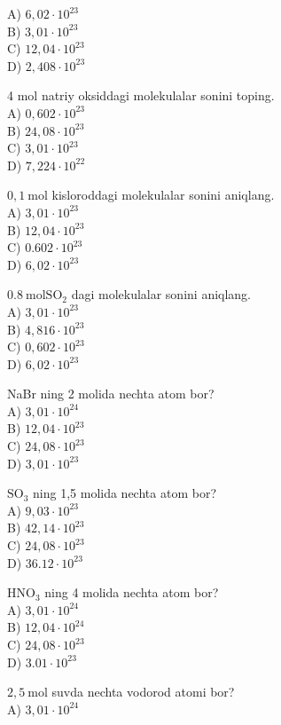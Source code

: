 A) $6,02 \cdot 10^{23}$\\
B) $3,01 \cdot 10^{23}$\\
C) $12,04 \cdot 10^{23}$\\
D) $2,408 \cdot 10^{23}$
  \item 4 mol natriy oksiddagi molekulalar sonini toping.\\
A) $0,602 \cdot 10^{23}$\\
B) $24,08 \cdot 10^{23}$\\
C) $3,01 \cdot 10^{23}$\\
D) $7,224 \cdot 10^{22}$
  \item $0,1 \mathrm{~mol}$ kisloroddagi molekulalar sonini aniqlang.\\
A) $3,01 \cdot 10^{23}$\\
B) $12,04 \cdot 10^{23}$\\
C) $0.602 \cdot 10^{23}$\\
D) $6,02 \cdot 10^{23}$
  \item $0.8 \mathrm{~mol} \mathrm{SO}_{2}$ dagi molekulalar sonini aniqlang.\\
A) $3,01 \cdot 10^{23}$\\
B) $4,816 \cdot 10^{23}$\\
C) $0,602 \cdot 10^{23}$\\
D) $6,02 \cdot 10^{23}$
  \item NaBr ning 2 molida nechta atom bor?\\
A) $3,01 \cdot 10^{24}$\\
B) $12,04 \cdot 10^{23}$\\
C) $24,08 \cdot 10^{23}$\\
D) $3,01 \cdot 10^{23}$
  \item $\mathrm{SO}_{3}$ ning 1,5 molida nechta atom bor?\\
A) $9,03 \cdot 10^{23}$\\
B) $42,14 \cdot 10^{23}$\\
C) $24,08 \cdot 10^{23}$\\
D) $36.12 \cdot 10^{23}$
  \item $\mathrm{HNO}_{3}$ ning 4 molida nechta atom bor?\\
A) $3,01 \cdot 10^{24}$\\
B) $12,04 \cdot 10^{24}$\\
C) $24,08 \cdot 10^{23}$\\
D) $3.01 \cdot 10^{23}$
  \item $2,5 \mathrm{~mol}$ suvda nechta vodorod atomi bor?\\
A) $3,01 \cdot 10^{24}$\\
